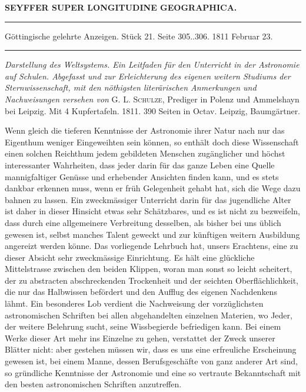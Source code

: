 \clearpage
{}
\noindent\makebox[10mm][l]{}%
\parbox[b]{\dimexpr\textwidth-20mm\relax}{\centering\small\textbf{SEYFFER SUPER LONGITUDINE GEOGRAPHICA.}}%
\par\nobreak\medskip
\begin{center}
\parbox{.92\linewidth}{\centering\small
\rule{\linewidth}{.3pt}\par\smallskip
Göttingische gelehrte Anzeigen. Stück 21. Seite 305..306. 1811 Februar 23.\par\smallskip
\rule{\linewidth}{.3pt}}
\end{center}
\par\medskip

\emph{Darstellung des Weltsystems. Ein Leitfaden für den Unterricht in der Astronomie auf Schulen. Abgefasst und zur Erleichterung des eigenen weitern Studiums der Sternwissenschaft, mit den nöthigsten literärischen Anmerkungen und Nachweisungen versehen von} G. L. \textsc{Schulze}, Prediger in Polenz und Ammelshayn bei Leipzig. Mit 4 Kupfertafeln. 1811. 390 Seiten in Octav. Leipzig, Baumgärtner.

Wenn gleich die tieferen Kenntnisse der Astronomie ihrer Natur nach nur das Eigenthum weniger Eingeweihten sein können, so enthält doch diese Wissenschaft einen solchen Reichthum jedem gebildeten Menschen zugänglicher und höchst interessanter Wahrheiten, dass jeder darin für das ganze Leben eine Quelle mannigfaltiger Genüsse und erhebender Ansichten finden kann, und es stets dankbar erkennen muss, wenn er früh Gelegenheit gehabt hat, sich die Wege dazu bahnen zu lassen. Ein zweckmässiger Unterricht darin für das jugendliche Alter ist daher in dieser Hinsicht etwas sehr Schätzbares, und es ist nicht zu bezweifeln, dass durch eine allgemeinere Verbreitung desselben, als bisher bei uns üblich gewesen ist, selbst manches Talent geweckt und zur künftigen weitern Ausbildung angereizt werden könne. Das vorliegende Lehrbuch hat, unsers Erachtens, eine zu dieser Absicht sehr zweckmässige Einrichtung. Es hält eine glückliche Mittelstrasse zwischen den beiden Klippen, woran man sonst so leicht scheitert, der zu abstracten abschreckenden Trockenheit und der seichten Oberflächlichkeit, die nur das Halbwissen befördert und den Aufflug des eigenen Nachdenkens lähmt. Ein besonderes Lob verdient die Nachweisung der vorzüglichsten astronomischen Schriften bei allen abgehandelten einzelnen Materien, wo Jeder, der weitere Belehrung sucht, seine Wissbegierde befriedigen kann. Bei einem Werke dieser Art mehr ins Einzelne zu gehen, verstattet der Zweck unserer Blätter nicht: aber gestehen müssen wir, dass es uns eine erfreuliche Erscheinung gewesen ist, bei einem Manne, dessen Berufsgeschäfte von ganz anderer Art sind, so gründliche Kenntnisse der Astronomie und eine so vertraute Bekanntschaft mit den besten astronomischen Schriften anzutreffen.

